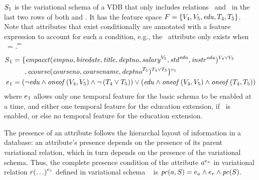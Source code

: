 \begin{example}
\label{eg:vsch}
$\vSch_1$ is the variational schema of a VDB that only includes relations \empacct\ and \ecourse\ in the last two rows
of both  and . It has the
feature space 
\ensuremath{\features = \setDef{ \vFour, \vFive, \edu, \tFour, \tFive}}.
Note that attributes that exist conditionally are annotated with a feature expression
to account for such a condition, e.g., the \salary\ attribute only exists when \vFive\ = \t.
%
\begin{align*}
\vSch_1 &=
\{ \empacct ( \empno, \hiredate, \titleatt, \deptno, \annot [\vFive] \salary, 
 \annot [\edu] \isstudent,
\annot [\edu] \isteacher )^{\vFour \vee \vFive}\\
%
&\hspace{17pt}, \ecourse ( \cno, \cname, \annot [\tFive] \deptno )^{\tFour \vee \tFive} \}^{\dimMeta_1}\\
\dimMeta_1 &= 
\paran {\neg \edu \wedge \oneof {\vFour, \vFive} \wedge \neg \paran {\tFour \vee \tFive}
 }
\vee
\paran {\edu \wedge \oneof {\vFour, \vFive}
\wedge
\oneof {\tFour, \tFive}}
\end{align*}
where \ensuremath{\dimMeta_1} allows only one temporal feature for the basic
schema to be enabled at a time, and either one temporal feature for the education
extension, if \edu\ is enabled, or else no temporal feature for the education
extension.
\end{example}



The presence of an attribute follows the hierarchal layout of information in a database:
an attribute's presence depends on the presence of its parent variational relation, which in turn 
depends on the presence of the variational schema. 
%
Thus, the complete presence condition of the attribute
$\annot[\dimMeta_\vAtt]{\vAtt}$ in variational relation
$\vRel\annot[\dimMeta_\vRel]{(\ldots)}$ defined in variational schema \vSch\
is
$\getPCfrom{\vAtt}{\vSch}=\dimMeta_\vAtt\wedge\dimMeta_\vRel\wedge \getPC \vSch$.

